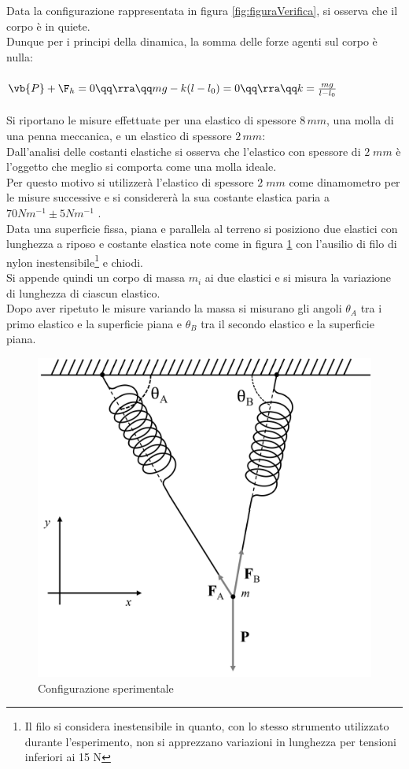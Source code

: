 Data la configurazione rappresentata in figura \ref{fig:figuraVerifica}, si osserva che il corpo è in quiete.\\ 
Dunque per i principi della dinamica, la somma delle forze agenti sul corpo è nulla:\\\\
$\vb{P} + \F_h = 0 \qq \rra \qq mg - k(l-l_0) = 0 \qq \rra \qq k = \frac{mg}{l-l_0}$\\ \\
Si riportano le misure effettuate per una elastico di spessore $8\,mm$, una molla di una penna meccanica, e un elastico di spessore $2\,mm$:\\



Dall'analisi delle costanti elastiche si osserva che l'elastico con spessore di $2\;mm$ è l'oggetto che meglio si comporta come una molla ideale.\\
Per questo motivo si utilizzerà l'elastico di spessore $2\;mm$ come dinamometro per le misure successive
 e si considererà la sua costante elastica paria a $70 Nm^{-1} \pm 5 Nm^{-1}$ .\\
\newpage
{}
Data una superficie fissa, piana e parallela al terreno si posiziono due elastici con lunghezza a riposo e costante elastica note come in figura \ref{fig:figuraEsperimento} 
con l'ausilio di filo di nylon inestensibile\footnote{Il filo si considera inestensibile in quanto, con lo stesso strumento utilizzato durante l'esperimento, non si apprezzano variazioni in lunghezza per tensioni inferiori ai 15 N} e chiodi.\\
Si appende quindi un corpo di massa $m_i$ ai due elastici e si misura la variazione di lunghezza di ciascun elastico.\\
Dopo aver ripetuto le misure variando la massa si misurano gli angoli
$\theta_A$ tra i primo elastico e la superficie piana e $\theta_B$ tra il secondo elastico e la superficie piana.\\
\snls 
\begin{figure}[h!]
        \centering
        \includegraphics[scale = 0.5]{figures/esperimento.png}
        \caption{Configurazione sperimentale}
        \label{fig:figuraEsperimento}
\end{figure}
